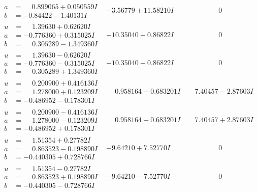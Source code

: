 \documentclass[1p]{elsarticle_modified}
\theoremstyle{definition}
\begin{document}
$$\begin{array}{c|c|c}
\begin{aligned}
a &= \phantom{-}0.899065 + 0.050559 I \\
b &= -0.84422 - 1.40131 I\end{aligned}
 & -3.56779 + 11.58210 I & \phantom{-0.000000 } 0 \\ \hline\begin{aligned}
u &= \phantom{-}1.39630 + 0.62620 I \\
a &= -0.776360 + 0.315025 I \\
b &= \phantom{-}0.305289 - 1.349360 I\end{aligned}
 & -10.35040 + 0.86822 I & \phantom{-0.000000 } 0 \\ \hline\begin{aligned}
u &= \phantom{-}1.39630 - 0.62620 I \\
a &= -0.776360 - 0.315025 I \\
b &= \phantom{-}0.305289 + 1.349360 I\end{aligned}
 & -10.35040 - 0.86822 I & \phantom{-0.000000 } 0 \\ \hline\begin{aligned}
u &= \phantom{-}0.200900 + 0.416136 I \\
a &= \phantom{-}1.278000 + 0.123209 I \\
b &= -0.486952 - 0.178301 I\end{aligned}
 & \phantom{-}0.958164 + 0.683201 I & \phantom{-}7.40457 - 2.87603 I \\ \hline\begin{aligned}
u &= \phantom{-}0.200900 - 0.416136 I \\
a &= \phantom{-}1.278000 - 0.123209 I \\
b &= -0.486952 + 0.178301 I\end{aligned}
 & \phantom{-}0.958164 - 0.683201 I & \phantom{-}7.40457 + 2.87603 I \\ \hline\begin{aligned}
u &= \phantom{-}1.51354 + 0.27782 I \\
a &= \phantom{-}0.863523 - 0.198890 I \\
b &= -0.440305 + 0.728766 I\end{aligned}
 & -9.64210 + 7.52770 I & \phantom{-0.000000 } 0 \\ \hline\begin{aligned}
u &= \phantom{-}1.51354 - 0.27782 I \\
a &= \phantom{-}0.863523 + 0.198890 I \\
b &= -0.440305 - 0.728766 I\end{aligned}
 & -9.64210 - 7.52770 I & \phantom{-0.000000 } 0 \\ \hline\begin{aligned}

\end{aligned}
\end{array}$$
\end{document}
